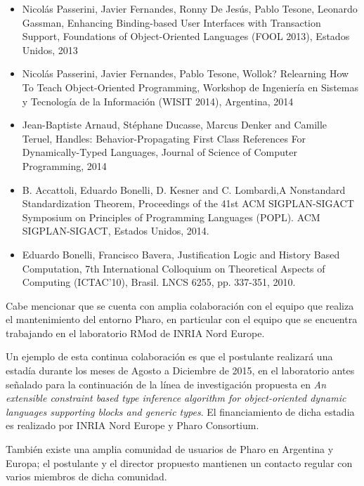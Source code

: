 \documentclass[a4paper,10pt]{article}
\begin{document}
\begin{itemize}
 \item Nicolás Passerini, Javier Fernandes, Ronny De Jesús, Pablo Tesone, Leonardo Gassman, Enhancing Binding-based User Interfaces with Transaction Support, Foundations of Object-Oriented Languages (FOOL 2013), Estados Unidos, 2013
 
 \item Nicolás Passerini, Javier Fernandes, Pablo Tesone, Wollok? Relearning How To Teach Object-Oriented Programming, Workshop de Ingeniería en Sistemas y Tecnología de la Información (WISIT 2014), Argentina, 2014
 
 \item Jean-Baptiste Arnaud, Stéphane Ducasse, Marcus Denker and Camille Teruel, Handles: Behavior-Propagating First Class References For Dynamically-Typed Languages, Journal of Science of Computer Programming, 2014
 
 \item B. Accattoli,  Eduardo Bonelli, D. Kesner and C. Lombardi,A Nonstandard Standardization Theorem, Proceedings of the 41st ACM SIGPLAN-SIGACT Symposium on Principles of Programming Languages (POPL). ACM SIGPLAN-SIGACT, Estados Unidos, 2014.
 
 \item Eduardo Bonelli, Francisco Bavera, Justification Logic and History Based Computation, 7th International Colloquium on Theoretical Aspects of Computing (ICTAC'10), Brasil. LNCS 6255, pp. 337-351, 2010.
\end{itemize}

\medskip
Cabe mencionar que se cuenta con amplia colaboración con el equipo que realiza el mantenimiento del entorno Pharo, en particular con el equipo que se encuentra trabajando en el laboratorio RMod de INRIA Nord Europe. 

Un ejemplo de esta continua colaboración es que el postulante realizará una estadía durante los meses de Agosto a Diciembre de 2015, en el laboratorio antes señalado para la continuación de la línea de investigación propuesta en \emph{An extensible constraint based type inference algorithm for object-oriented dynamic languages supporting blocks and generic types}. El financiamiento de dicha estadia es realizado por INRIA Nord Europe y Pharo Consortium.

También existe una amplia comunidad de usuarios de Pharo en Argentina y Europa; el postulante y el director propuesto mantienen un contacto regular con varios miembros de dicha comunidad.
\end{document}
